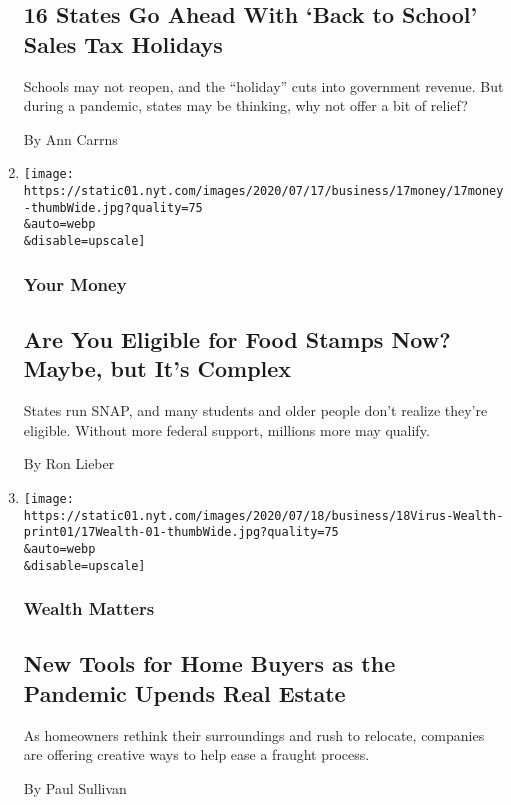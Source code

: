 \begin{enumerate}
  \hypertarget{16-states-go-ahead-with-back-to-school-sales-tax-holidays}{%
  \subsection{16 States Go Ahead With `Back to School' Sales Tax
  Holidays}\label{16-states-go-ahead-with-back-to-school-sales-tax-holidays}}

  Schools may not reopen, and the ``holiday'' cuts into government
  revenue. But during a pandemic, states may be thinking, why not offer
  a bit of relief?

  By Ann Carrns
\item
  \href{/2020/07/17/your-money/food-stamps-coronavirus.html}{}

  \texttt{[image: https://static01.nyt.com/images/2020/07/17/business/17money/17money-thumbWide.jpg?quality=75\\\&auto=webp\\\&disable=upscale]}

  \hypertarget{your-money-1}{%
  \subsubsection{Your Money}\label{your-money-1}}

  \hypertarget{are-you-eligible-for-food-stamps-now-maybe-but-its-complex}{%
  \subsection{Are You Eligible for Food Stamps Now? Maybe, but It's
  Complex}\label{are-you-eligible-for-food-stamps-now-maybe-but-its-complex}}

  States run SNAP, and many students and older people don't realize
  they're eligible. Without more federal support, millions more may
  qualify.

  By Ron Lieber
\item
  \href{/2020/07/17/your-money/real-estate-relocation-coronavirus.html}{}

  \texttt{[image: https://static01.nyt.com/images/2020/07/18/business/18Virus-Wealth-print01/17Wealth-01-thumbWide.jpg?quality=75\\\&auto=webp\\\&disable=upscale]}

  \hypertarget{wealth-matters-2}{%
  \subsubsection{Wealth Matters}\label{wealth-matters-2}}

  \hypertarget{new-tools-for-home-buyers-as-the-pandemic-upends-real-estate}{%
  \subsection{New Tools for Home Buyers as the Pandemic Upends Real
  Estate}\label{new-tools-for-home-buyers-as-the-pandemic-upends-real-estate}}

  As homeowners rethink their surroundings and rush to relocate,
  companies are offering creative ways to help ease a fraught process.

  By Paul Sullivan
\end{enumerate}

